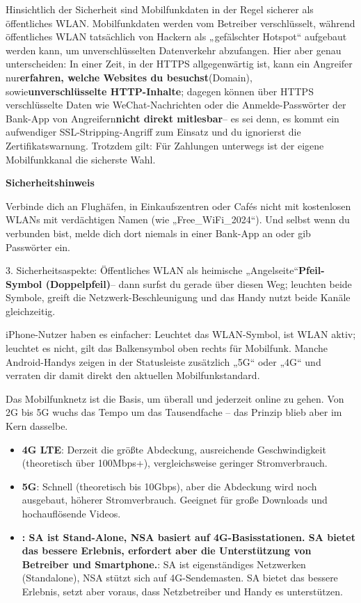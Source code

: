 Hinsichtlich der Sicherheit sind Mobilfunkdaten in der Regel sicherer als öffentliches WLAN. Mobilfunkdaten werden vom Betreiber verschlüsselt, während öffentliches WLAN tatsächlich von Hackern als „gefälschter Hotspot“ aufgebaut werden kann, um unverschlüsselten Datenverkehr abzufangen. Hier aber genau unterscheiden: In einer Zeit, in der HTTPS allgegenwärtig ist, kann ein Angreifer nur\textbf{erfahren, welche Websites du besuchst}(Domain), sowie\textbf{unverschlüsselte HTTP-Inhalte}; dagegen können über HTTPS verschlüsselte Daten wie WeChat-Nachrichten oder die Anmelde-Passwörter der Bank-App von Angreifern\textbf{nicht direkt mitlesbar}– es sei denn, es kommt ein aufwendiger SSL-Stripping-Angriff zum Einsatz und du ignorierst die Zertifikatswarnung. Trotzdem gilt: Für Zahlungen unterwegs ist der eigene Mobilfunkkanal die sicherste Wahl.

\textbf{Sicherheitshinweis}\par

Verbinde dich an Flughäfen, in Einkaufszentren oder Cafés nicht mit kostenlosen WLANs mit verdächtigen Namen (wie „Free\_WiFi\_2024“). Und selbst wenn du verbunden bist, melde dich dort niemals in einer Bank-App an oder gib Passwörter ein.


3. Sicherheitsaspekte: Öffentliches WLAN als heimische „Angelseite“\textbf{Pfeil-Symbol (Doppelpfeil)}– dann surfst du gerade über diesen Weg; leuchten beide Symbole, greift die Netzwerk-Beschleunigung und das Handy nutzt beide Kanäle gleichzeitig.

iPhone-Nutzer haben es einfacher: Leuchtet das WLAN-Symbol, ist WLAN aktiv; leuchtet es nicht, gilt das Balkensymbol oben rechts für Mobilfunk. Manche Android-Handys zeigen in der Statusleiste zusätzlich „5G“ oder „4G“ und verraten dir damit direkt den aktuellen Mobilfunkstandard.


Das Mobilfunknetz ist die Basis, um überall und jederzeit online zu gehen. Von 2G bis 5G wuchs das Tempo um das Tausendfache – das Prinzip blieb aber im Kern dasselbe.


\begin{itemize}
  \item \textbf{4G LTE}: Derzeit die größte Abdeckung, ausreichende Geschwindigkeit (theoretisch über 100Mbps+), vergleichsweise geringer Stromverbrauch.
  \item \textbf{5G}: Schnell (theoretisch bis 10Gbps), aber die Abdeckung wird noch ausgebaut, höherer Stromverbrauch. Geeignet für große Downloads und hochauflösende Videos.
  \item \textbf{: SA ist Stand-Alone, NSA basiert auf 4G-Basisstationen. SA bietet das bessere Erlebnis, erfordert aber die Unterstützung von Betreiber und Smartphone.}: SA ist eigenständiges Netzwerken (Standalone), NSA stützt sich auf 4G-Sendemasten. SA bietet das bessere Erlebnis, setzt aber voraus, dass Netzbetreiber und Handy es unterstützen.
\end{itemize}

